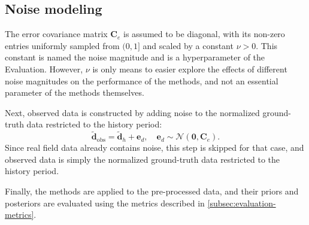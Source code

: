 \subsection{Noise modeling}
\label{subsec:noise-modeling}
%
The error covariance matrix $\mathbf{C}_e$ is assumed to be diagonal, 
with its non-zero entries uniformly sampled from $(0, 1]$ and scaled by a constant $\nu > 0$.
This constant is named the noise magnitude and is a hyperparameter of the Evaluation.
However, $\nu$ is only means to easier explore the effects of different noise magnitudes on the performance of the methods,
and not an essential parameter of the methods themselves.

Next, observed data is constructed by adding noise to the normalized ground-truth data restricted to the history period:
%
\begin{equation}
    \widetilde{\mathbf{d}}_\text{obs} = \widetilde{\mathbf{d}}_h + \mathbf{e}_d, \quad
    \mathbf{e}_d \sim \mathcal{N}(\mathbf{0}, \mathbf{C}_e).
\end{equation}
%
Since real field data already contains noise, this step is skipped for that case, 
and observed data is simply the normalized ground-truth data restricted to the history period.

Finally, the methods are applied to the pre-processed data, 
and their priors and posteriors are evaluated using the metrics described in \cref{subsec:evaluation-metrics}.

